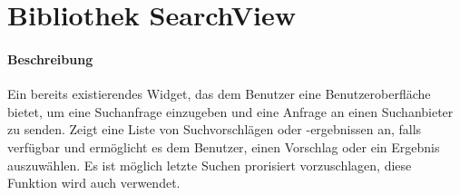 \section{Bibliothek SearchView}
\paragraph*{Beschreibung}
Ein bereits existierendes Widget, das dem Benutzer eine Benutzeroberfläche bietet, um eine Suchanfrage einzugeben und eine Anfrage an einen Suchanbieter zu senden. 
Zeigt eine Liste von Suchvorschlägen oder -ergebnissen an, falls verfügbar 
und ermöglicht es dem Benutzer, einen Vorschlag oder ein Ergebnis auszuwählen.
Es ist möglich letzte Suchen prorisiert vorzuschlagen, diese Funktion wird auch verwendet.
